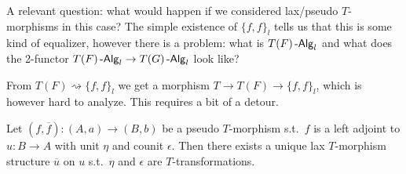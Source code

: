 \documentclass[a4paper,11pt,oneside,openany]{scrbook}
\begin{document}
A relevant question: what would happen if we considered lax/pseudo
$T$-morphisms in this case? The simple existence of $\{f,f\}_l$ tells us that
this is some kind of equalizer, however there is a problem: what is $T(F)\operatorname{-\mathsf{Alg}}_l$
and what does the 2-functor $T(F)\operatorname{-\mathsf{Alg}}_l\rightarrow T(G)\operatorname{-\mathsf{Alg}}_l$ look like?

From $T(F)\rightsquigarrow\{f,f\}_l$ we get a morphism $T\rightarrow
T(F)\rightarrow\{f,f\}_l$, which is however hard to analyze. This requires a bit
of a detour.

\begin{thm}
    Let $(f,\overline{f})\colon(A,a)\rightarrow(B,b)$ be a pseudo $T$-morphism
    s.t.\ $f$ is a left adjoint to $u\colon B\rightarrow A$ with unit $\eta$ and
    counit $\epsilon$. Then there exists a unique lax $T$-morphism structure
    $\overline{u}$ on $u$ s.t.\ $\eta$ and $\epsilon$ are $T$-transformations.
\end{thm}
\end{document}
